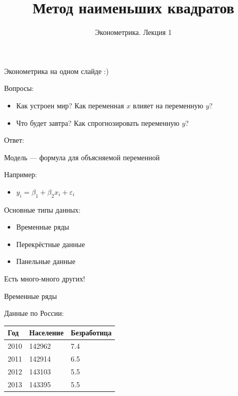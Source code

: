 \documentclass[ignorenonframetext,]{beamer}
\author[Эконометрика. Лекция 1]{Эконометрика. Лекция 1}
\title{Метод наименьших квадратов}
\date{}
\begin{document}
\frame{\titlepage}

\begin{frame}{Эконометрика на одном слайде :)}

\begin{block}{Вопросы:}

\begin{itemize}
\itemsep1pt\parskip0pt
\item
  Как устроен мир? Как переменная \(x\) влияет на переменную \(y\)?
\item
  Что будет завтра? Как спрогнозировать переменную \(y\)?
\end{itemize}

\end{block}

\begin{block}{Ответ:}

Модель --- формула для объясняемой переменной

\end{block}

\begin{block}{Например:}

\begin{itemize}
\itemsep1pt\parskip0pt
\item
  \(y_i=\beta_1+\beta_2 x_i + \varepsilon_i\) 
\end{itemize}

\end{block}

\end{frame}

\begin{frame}{Основные типы данных:}

\begin{itemize}
\itemsep1pt\parskip0pt
\item
  Временные ряды
\item
  Перекрёстные данные
\item
  Панельные данные
\end{itemize}

Есть много-много других!

\end{frame}

\begin{frame}{Временные ряды}

Данные по России:

\begin{longtable}[c]{@{}lll@{}}
\toprule
Год & Население & Безработица\tabularnewline
\midrule
\endhead
2010 & 142962 & 7.4\tabularnewline
2011 & 142914 & 6.5\tabularnewline
2012 & 143103 & 5.5\tabularnewline
2013 & 143395 & 5.5\tabularnewline
\bottomrule
\end{longtable}

\end{frame}
\end{document}
